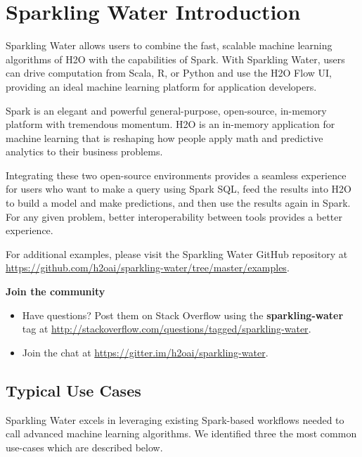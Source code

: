 \documentclass{standalone}
\begin{document}
\section{Sparkling Water Introduction}

Sparkling Water allows users to combine the fast, scalable machine learning algorithms of H2O with the capabilities of Spark. With Sparkling Water, users can drive computation from Scala, R, or Python and use the H2O Flow UI, providing an ideal machine learning platform for application developers.

Spark is an elegant and powerful general-purpose, open-source, in-memory platform with tremendous momentum. H2O is an in-memory application for machine learning that is reshaping how people apply math and predictive analytics to their business problems.

Integrating these two open-source environments provides a seamless experience for users who want to make a query using Spark SQL, feed the results into H2O to build a model and make predictions, and then use the results again in Spark. For any given problem, better interoperability between tools provides a better experience. 

For additional examples, please visit the Sparkling Water GitHub repository at {\url{https://github.com/h2oai/sparkling-water/tree/master/examples}}.

\begin{minipage}{\textwidth}
    \textbf{Join the community}
    \setlength{\parskip}{1em}
    \begin{itemize}
        \setlength\itemsep{1pt}
        \item Have questions? Post them on Stack Overflow using the \textbf{sparkling-water} tag at {\url{http://stackoverflow.com/questions/tagged/sparkling-water}}.
        \item Join the chat at {\url{https://gitter.im/h2oai/sparkling-water}}.
    \end{itemize}
\end{minipage}

\subsection{Typical Use Cases}
Sparkling Water excels in leveraging existing Spark-based workflows needed to call advanced machine learning algorithms. We identified three the most common use-cases which are described below. 
\end{document}
